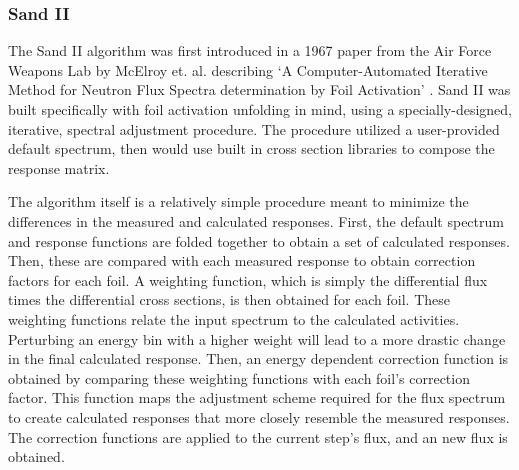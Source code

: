 \subsubsection{Sand II}

The Sand II algorithm was first introduced in a 1967 paper from the Air Force Weapons Lab by McElroy et. al. describing `A Computer-Automated Iterative Method for Neutron Flux Spectra determination by Foil Activation' \cite{mcelroy1967computer}.
Sand II was built specifically with foil activation unfolding in mind, using a specially-designed, iterative, spectral adjustment procedure.
The procedure utilized a user-provided default spectrum, then would use built in cross section libraries to compose the response matrix.

The algorithm itself is a relatively simple procedure meant to minimize the differences in the measured and calculated responses.
First, the default spectrum and response functions are folded together to obtain a set of calculated responses.
Then, these are compared with each measured response to obtain correction factors for each foil.
A weighting function, which is simply the differential flux times the differential cross sections, is then obtained for each foil.
These weighting functions relate the input spectrum to the calculated activities.
Perturbing an energy bin with a higher weight will lead to a more drastic change in the final calculated response.
Then, an energy dependent correction function is obtained by comparing these weighting functions with each foil's correction factor.
This function maps the adjustment scheme required for the flux spectrum to create calculated responses that more closely resemble the measured responses.
The correction functions are applied to the current step's flux, and an new flux is obtained.

